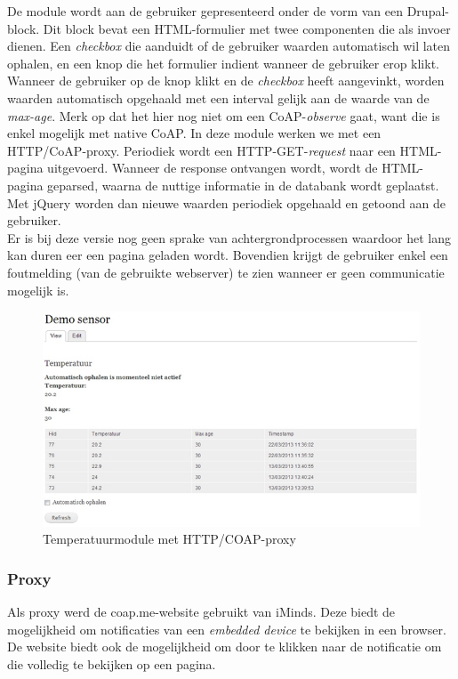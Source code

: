 De module wordt aan de gebruiker gepresenteerd onder de vorm van een Drupal-block. Dit block bevat een HTML-formulier met twee componenten die als invoer dienen. Een \textit{\textit{checkbox}} die aanduidt of de gebruiker waarden automatisch wil laten ophalen, en een knop die het formulier indient wanneer de gebruiker erop klikt.\\
Wanneer de gebruiker op de knop klikt en de \textit{\textit{checkbox}} heeft aangevinkt, worden waarden automatisch opgehaald met een interval gelijk aan de waarde van de \textit{max-age}. Merk op dat het hier nog niet om een CoAP-\textit{observe} gaat, want die is enkel mogelijk met native CoAP. In deze module werken we met een HTTP/CoAP-proxy. Periodiek wordt een HTTP-GET-\textit{request} naar een HTML-pagina uitgevoerd. Wanneer de response ontvangen wordt, wordt de HTML-pagina geparsed, waarna de nuttige informatie in de databank wordt geplaatst. Met jQuery worden dan nieuwe waarden periodiek opgehaald en getoond aan de gebruiker.\\

Er is bij deze versie nog geen sprake van achtergrondprocessen waardoor het lang kan duren eer een pagina geladen wordt. Bovendien krijgt de gebruiker enkel een foutmelding (van de gebruikte webserver) te zien wanneer er geen communicatie mogelijk is.

\begin{figure}[h!]
\vspace{10pt}
\includegraphics[width=1\textwidth]{fig/TemperatuurModuleHTTPCOAPProxy}
\vspace{-30pt}
\caption{Temperatuurmodule met HTTP/COAP-proxy}
\vspace{-10pt}
\end{figure}

\subsubsection{Proxy}
Als proxy werd de coap.me-website \cite{coapMe} gebruikt van iMinds. Deze biedt de mogelijkheid om notificaties van een \textit{embedded device} te bekijken in een browser. De website biedt ook de mogelijkheid om door te klikken naar de notificatie om die volledig te bekijken op een pagina.\\

